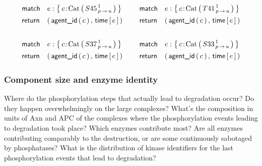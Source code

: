 \newcommand{\UndoQ}[1]{
\Query{
    \m{match} & e:\Set{ 
      \iAG{c}{\BetaCat}{{#1}^{\,1}_{\Trans{p}{u}}}
    } \\
    \m{return} & \Par{\AgentId{c},\, \Time{e}}
  }
}

\begin{small}
  \begin{equation*}
    \arraycolsep=7pt
    \begin{array}{cc}
      \UndoQ{S45} & \UndoQ{T41} \\ \\
      \UndoQ{S37} & \UndoQ{S33} \\
    \end{array}
  \end{equation*}
\end{small}



\subsubsection*{Component size and enzyme identity} 
Where do the phosphorylation steps that actually lead to degradation
occur? Do they happen overwhelmingly on the large complexes? What’s
the composition in units of Axn and APC of the complexes where the
phosphorylation events leading to degradation took place?  Which
enzymes contribute most? Are all enzymes contributing comparably to
the destruction, or are some continuously sabotaged by phosphatases?
What is the distribution of kinase identifiers for the last
phosphorylation events that lead to degradation?

\newcommand{\BigHectorStoryLine}[4]{
\LastBefore{#1:\Set{ 
          \iAG{c}{\BetaCat}{ {#2}^{\,1}_{\Trans{u}{p}}}, \ 
          \iAG{#3}{#4}{c^{\,1}}
    }}{d}
}
\newcommand{\BigHectorStoryRet}[2]{
\AgentId{#1}, \ \Count{ \Component{\StateBefore{#2}}{#1}, \, 
      \STR{Axn}, \, \STR{APC} }
}


